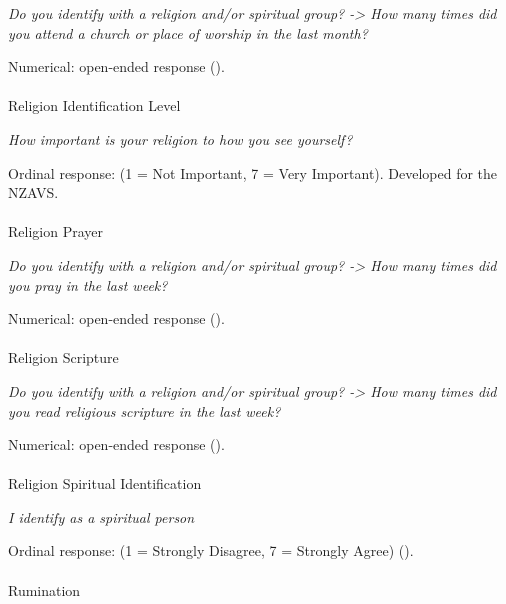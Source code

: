 \documentclass[
  single column]{article}
\makeatletter
\let\oldparagraph\paragraph
\renewcommand{\paragraph}{
    \@ifstar
      \xxxParagraphStar
      \xxxParagraphNoStar
  }
\newcommand{\xxxParagraphStar}[1]{\oldparagraph*{#1}\mbox{}}
\newcommand{\xxxParagraphNoStar}[1]{\oldparagraph{#1}\mbox{}}
\makeatother
\begin{document}
\emph{Do you identify with a religion and/or spiritual group?
-\textgreater{} How many times did you attend a church or place of
worship in the last month?}

Numerical: open-ended response ().

\paragraph{Religion Identification
Level}\label{religion-identification-level}

\emph{How important is your religion to how you see yourself?}

Ordinal response: (1 = Not Important, 7 = Very Important). Developed for
the NZAVS.

\paragraph{Religion Prayer}\label{religion-prayer}

\emph{Do you identify with a religion and/or spiritual group?
-\textgreater{} How many times did you pray in the last week?}

Numerical: open-ended response ().

\paragraph{Religion Scripture}\label{religion-scripture}

\emph{Do you identify with a religion and/or spiritual group?
-\textgreater{} How many times did you read religious scripture in the
last week?}

Numerical: open-ended response ().

\paragraph{Religion Spiritual
Identification}\label{religion-spiritual-identification}

\emph{I identify as a spiritual person}

Ordinal response: (1 = Strongly Disagree, 7 = Strongly Agree)
().

\paragraph{Rumination}\label{rumination-1}
\end{document}
